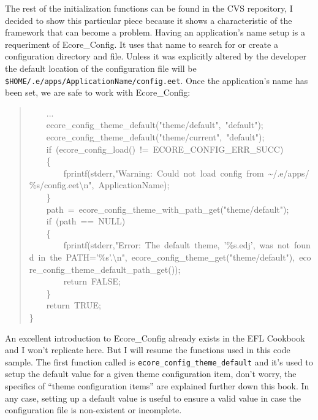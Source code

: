 \documentclass[12pt,a4paper,english]{book}
\begin{document}
The rest of the initialization functions can be found in the CVS repository, I
decided to show this particular piece because it shows a characteristic of the
framework that can become a problem. Having an application's name setup is a
requeriment of Ecore{\_}Config. It uses that name to search for or create a
configuration directory and file. Unless it was explicitly altered by the
developer the default location of the configuration file will be
\texttt{{\$}HOME/.e/apps/ApplicationName/config.eet}. Once the application's name has
been set, we are safe to work with Ecore{\_}Config:
\begin{quote}{\ttfamily \raggedright \noindent
~~~~...~\\
~~~~ecore{\_}config{\_}theme{\_}default("theme/default",~"default");~\\
~~~~ecore{\_}config{\_}theme{\_}default("theme/current",~"default");~\\
~~~~if~(ecore{\_}config{\_}load()~!=~ECORE{\_}CONFIG{\_}ERR{\_}SUCC)~\\
~~~~{\{}~\\
~~~~~~~~fprintf(stderr,"Warning:~Could~not~load~config~from~{\textasciitilde}/.e/apps/{\%}s/config.eet{\textbackslash}n",~ApplicationName);~\\
~~~~{\}}~\\
~~~~path~=~ecore{\_}config{\_}theme{\_}with{\_}path{\_}get("theme/default");~\\
~~~~if~(path~==~NULL)~\\
~~~~{\{}~\\
~~~~~~~~fprintf(stderr,"Error:~The~default~theme,~'{\%}s.edj',~was~not~found~in~the~PATH='{\%}s'.{\textbackslash}n",~ecore{\_}config{\_}theme{\_}get("theme/default"),~ecore{\_}config{\_}theme{\_}default{\_}path{\_}get());~\\
~~~~~~~~return~FALSE;~\\
~~~~{\}}~\\
~~~~return~TRUE;~\\
{\}}
}\end{quote}

An excellent introduction to Ecore{\_}Config already exists in the EFL Cookbook
and I won't replicate here. But I will resume the functions used in this code
sample. The first function called is \texttt{ecore{\_}config{\_}theme{\_}default} and it's
used to setup the default value for a given theme configuration item, don't
worry, the specifics of ``theme configuration items'' are explained further down
this book. In any case, setting up a default value is useful to ensure a valid
value in case the configuration file is non-existent or incomplete.
\end{document}
